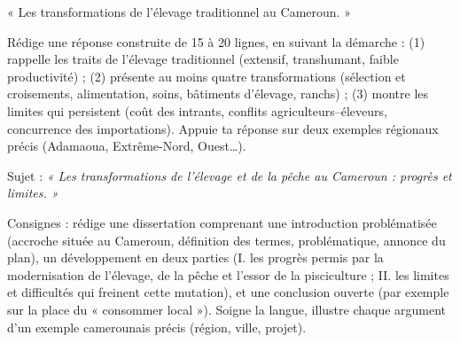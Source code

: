 \documentclass[11pt]{article}
\newcounter{popsec}
\newcounter{popsub}
\newcommand{\courssub}[1]{%
  \stepcounter{popsub}%
  \par\vspace{9pt}\noindent{\popxbold\fontsize{11.5}{13}\selectfont\color{popink}{\color{poporange}\thepopsec.\thepopsub}\hspace{6pt}#1}\par\nopagebreak\vspace{4pt}
}
\begin{document}
\begin{exercice}
« Les transformations de l'élevage traditionnel au Cameroun. »

Rédige une réponse construite de 15 à 20 lignes, en suivant la démarche : (1) rappelle les traits de l'élevage traditionnel (extensif, transhumant, faible productivité) ; (2) présente au moins quatre transformations (sélection et croisements, alimentation, soins, bâtiments d'élevage, ranchs) ; (3) montre les limites qui persistent (coût des intrants, conflits agriculteurs--éleveurs, concurrence des importations). Appuie ta réponse sur deux exemples régionaux précis (Adamaoua, Extrême-Nord, Ouest\ldots).
\end{exercice}

\courssub{Je me prépare au Bac}

\begin{exercice}
Sujet : \emph{« Les transformations de l'élevage et de la pêche au Cameroun : progrès et limites. »}

Consignes : rédige une dissertation comprenant une introduction problématisée (accroche située au Cameroun, définition des termes, problématique, annonce du plan), un développement en deux parties (I. les progrès permis par la modernisation de l'élevage, de la pêche et l'essor de la pisciculture ; II. les limites et difficultés qui freinent cette mutation), et une conclusion ouverte (par exemple sur la place du « consommer local »). Soigne la langue, illustre chaque argument d'un exemple camerounais précis (région, ville, projet).
\end{exercice}
\end{document}
